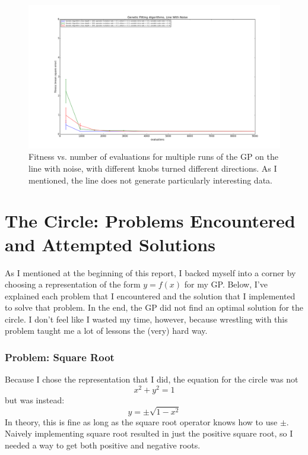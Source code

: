 \documentclass[11pt,amsmath,amssymb]{revtex4}
\begin{document}
\begin{figure}[H]
\center
\includegraphics[scale=0.35]{Line_With_Noise_Comparison.png}
\caption{Fitness vs. number of evaluations for multiple runs of the GP on the line with noise, with different knobs turned different directions. As I mentioned, the line does not generate particularly interesting data.}
\label{q1}
\end{figure}


\section{The Circle: Problems Encountered and Attempted Solutions}
As I mentioned at the beginning of this report, I backed myself into a corner by choosing a representation of the form $y=f(x)$ for my GP. Below, I've explained each problem that I encountered and the solution that I implemented to solve that problem. In the end, the GP did not find an optimal solution for the circle. I don't feel like I wasted my time, however, because wrestling with this problem taught me a lot of lessons the (very) hard way.

\subsubsection{Problem: Square Root}
Because I chose the representation that I did, the equation for the circle was not 
\begin{equation}
x^{2}+y^{2}=1
\end{equation}
but was instead:
\begin{equation}
y=\pm\sqrt{1-x^{2}}
\end{equation}
In theory, this is fine as long as the square root operator knows how to use $\pm$. Naively implementing square root resulted in just the positive square root, so I needed a way to get both positive and negative roots.
\end{document}
